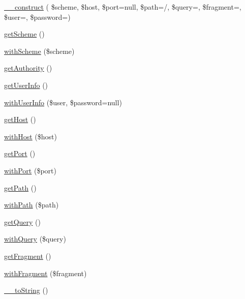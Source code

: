 \begin{DoxyCompactItemize}
\item 
\mbox{\hyperlink{class_pes_1_1_http_1_1_uri_ae4ff413f0f01becfb0249f58ebd309f0}{\+\_\+\+\_\+construct}} ( \$scheme, \$host, \$port=null, \$path=\textquotesingle{}/\textquotesingle{}, \$query=\textquotesingle{}\textquotesingle{}, \$fragment=\textquotesingle{}\textquotesingle{}, \$user=\textquotesingle{}\textquotesingle{}, \$password=\textquotesingle{}\textquotesingle{})
\item 
\mbox{\hyperlink{class_pes_1_1_http_1_1_uri_a812bc167005f6f5852c53693fb0156bb}{get\+Scheme}} ()
\item 
\mbox{\hyperlink{class_pes_1_1_http_1_1_uri_a6d54f7501ecd097fd0163a6b41ca62d0}{with\+Scheme}} (\$scheme)
\item 
\mbox{\hyperlink{class_pes_1_1_http_1_1_uri_a1f73860dd14340c5bad9094f0b5b97c2}{get\+Authority}} ()
\item 
\mbox{\hyperlink{class_pes_1_1_http_1_1_uri_a7e7999c3a04f08ffcc5e237fd28a6bc7}{get\+User\+Info}} ()
\item 
\mbox{\hyperlink{class_pes_1_1_http_1_1_uri_a1901e064f3ee84705b06a518f65f7cb0}{with\+User\+Info}} (\$user, \$password=null)
\item 
\mbox{\hyperlink{class_pes_1_1_http_1_1_uri_a39895a44b52bdced039e698588aaf18e}{get\+Host}} ()
\item 
\mbox{\hyperlink{class_pes_1_1_http_1_1_uri_a479b655e9d94a80d414188a30ed7adc9}{with\+Host}} (\$host)
\item 
\mbox{\hyperlink{class_pes_1_1_http_1_1_uri_afd4db46d3c12f47f0bee19cd2101be64}{get\+Port}} ()
\item 
\mbox{\hyperlink{class_pes_1_1_http_1_1_uri_aec8b0c6721da90f5fb19135ed6832f35}{with\+Port}} (\$port)
\item 
\mbox{\hyperlink{class_pes_1_1_http_1_1_uri_a30c5c67b2bf8e2e2ccc7e361faa20afe}{get\+Path}} ()
\item 
\mbox{\hyperlink{class_pes_1_1_http_1_1_uri_ac0e1d4efa52431e5e6adee322b62662f}{with\+Path}} (\$path)
\item 
\mbox{\hyperlink{class_pes_1_1_http_1_1_uri_a55f162785567258fe5138af282e588c2}{get\+Query}} ()
\item 
\mbox{\hyperlink{class_pes_1_1_http_1_1_uri_a7a6777fe7fccfc7dafd62fcbe09169de}{with\+Query}} (\$query)
\item 
\mbox{\hyperlink{class_pes_1_1_http_1_1_uri_a8e9be93affbfde43840cbaf4b6712ea9}{get\+Fragment}} ()
\item 
\mbox{\hyperlink{class_pes_1_1_http_1_1_uri_ad701d145b88cbec94ca8b31112944b9c}{with\+Fragment}} (\$fragment)
\item 
\mbox{\hyperlink{class_pes_1_1_http_1_1_uri_a7516ca30af0db3cdbf9a7739b48ce91d}{\+\_\+\+\_\+to\+String}} ()
\end{DoxyCompactItemize}
